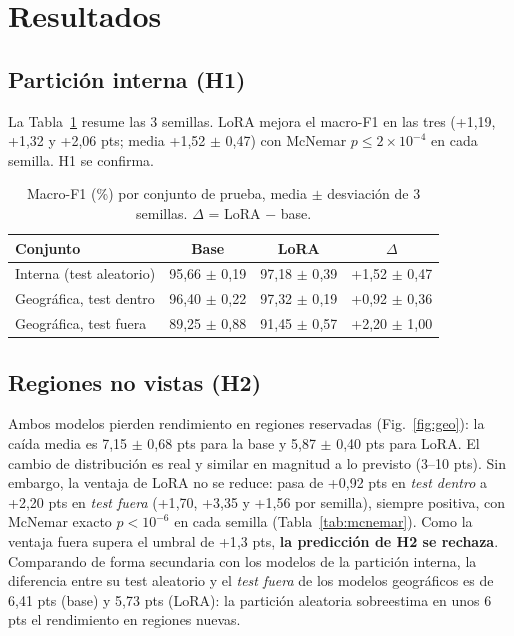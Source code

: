 \documentclass[conference,a4paper]{IEEEtran}
\begin{document}
\section{Resultados}
\subsection{Partición interna (H1)}
La Tabla~\ref{tab:semillas} resume las 3 semillas. LoRA mejora el macro-F1 en las tres (+1{,}19, +1{,}32 y +2{,}06 pts; media +1{,}52 $\pm$ 0{,}47) con McNemar $p\le2\times10^{-4}$ en cada semilla. H1 se confirma.

\begin{table}[t]
\centering
\caption{Macro-F1 (\%) por conjunto de prueba, media $\pm$ desviación de 3 semillas. $\Delta$ = LoRA $-$ base.}
\label{tab:semillas}
\begin{tabular}{@{}lccc@{}}
\toprule
Conjunto & Base & LoRA & $\Delta$ \\
\midrule
Interna (test aleatorio) & 95{,}66 $\pm$ 0{,}19 & 97{,}18 $\pm$ 0{,}39 & +1{,}52 $\pm$ 0{,}47 \\
Geográfica, test dentro & 96{,}40 $\pm$ 0{,}22 & 97{,}32 $\pm$ 0{,}19 & +0{,}92 $\pm$ 0{,}36 \\
Geográfica, test fuera & 89{,}25 $\pm$ 0{,}88 & 91{,}45 $\pm$ 0{,}57 & +2{,}20 $\pm$ 1{,}00 \\
\bottomrule
\end{tabular}
\end{table}

\subsection{Regiones no vistas (H2)}
Ambos modelos pierden rendimiento en regiones reservadas (Fig.~\ref{fig:geo}): la caída media es 7{,}15 $\pm$ 0{,}68 pts para la base y 5{,}87 $\pm$ 0{,}40 pts para LoRA. El cambio de distribución es real y similar en magnitud a lo previsto (3--10 pts). Sin embargo, la ventaja de LoRA no se reduce: pasa de +0{,}92 pts en \emph{test dentro} a +2{,}20 pts en \emph{test fuera} (+1{,}70, +3{,}35 y +1{,}56 por semilla), siempre positiva, con McNemar exacto $p<10^{-6}$ en cada semilla (Tabla~\ref{tab:mcnemar}). Como la ventaja fuera supera el umbral de +1{,}3 pts, \textbf{la predicción de H2 se rechaza}. Comparando de forma secundaria con los modelos de la partición interna, la diferencia entre su test aleatorio y el \emph{test fuera} de los modelos geográficos es de 6{,}41 pts (base) y 5{,}73 pts (LoRA): la partición aleatoria sobreestima en unos 6 pts el rendimiento en regiones nuevas.
\end{document}
